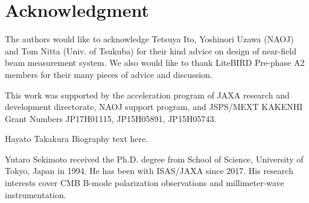 \documentclass[journal]{IEEEtran}
\begin{document}
\section*{Acknowledgment}
%
The authors would like to acknowledge Tetsuya Ito, Yoshinori Uzawa (NAOJ) and Tom Nitta (Univ. of Tsukuba) for 
their kind advice on design of near-field beam measurement system. We also would like to thank LiteBIRD Pre-phase A2 members for their many pieces of advice and discussion.
\par
This work was supported by 
the acceleration program of JAXA research and development directorate,
NAOJ support program, and
JSPS/MEXT KAKENHI Grant Numbers JP17H01115, JP15H05891, JP15H05743.
%
\ifCLASSOPTIONcaptionsoff
  \newpage
\fi
%
%
%


%
%
% 
%
\begin{IEEEbiography}{Hayato Takakura}
Biography text here.
\end{IEEEbiography}
%
%
\begin{IEEEbiographynophoto}{Yutaro Sekimoto}
received the Ph.D. degree from School of Science, University of Tokyo, Japan in 1994. 
He has been with ISAS/JAXA since 2017.
His research interests cover CMB B-mode polarization observations and millimeter-wave instrumentation.
\end{IEEEbiographynophoto}
\end{document}
